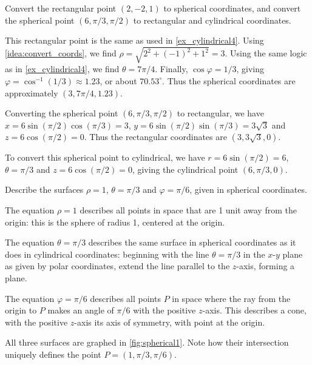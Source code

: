 
{Convert the rectangular point $(2,-2,1)$ to spherical coordinates, and convert the spherical point $(6,\pi/3,\pi/2)$ to rectangular and cylindrical coordinates.}
{This rectangular point is the same as used in \autoref{ex_cylindrical4}. Using \autoref{idea:convert_coords}, we find $\rho = \sqrt{2^2+(-1)^2+1^2} = 3$. Using the same logic as in \autoref{ex_cylindrical4}, we find $\theta = 7\pi/4$. Finally, $\cos\varphi = 1/3$, giving $\varphi = \cos^{-1}(1/3) \approx 1.23$, or about $70.53^\circ$. Thus the spherical coordinates are approximately $(3,7\pi/4,1.23)$.

Converting the spherical point $(6,\pi/3,\pi/2)$ to rectangular, we have $x = 6\sin(\pi/2)\cos(\pi/3) = 3$, $y = 6\sin(\pi/2)\sin(\pi/3) = 3\sqrt{3}$ and $z = 6\cos(\pi/2) = 0$. Thus the rectangular coordinates are $(3,3\sqrt{3},0)$.

To convert this spherical point to cylindrical, we have $r = 6\sin(\pi/2) = 6$, $\theta = \pi/3$ and $z = 6\cos(\pi/2) =0$, giving the cylindrical point $(6,\pi/3,0)$.}


{Describe the surfaces $\rho=1$, $\theta = \pi/3$ and $\varphi = \pi/6$, given in spherical coordinates.}
{The equation $\rho = 1$ describes all points in space that are 1 unit away from the origin: this is the sphere of radius 1, centered at the origin.

The equation $\theta = \pi/3$ describes the same surface in spherical coordinates as it does in cylindrical coordinates: beginning with the line $\theta = \pi/3$ in the $x$-$y$ plane as given by polar coordinates, extend the line parallel to the $z$-axis, forming a plane.

The equation $\varphi=\pi/6$ describes all points $P$ in space where the ray from the origin to $P$ makes an angle of $\pi/6$ with the positive $z$-axis. This describes a cone, with the positive $z$-axis its axis of symmetry, with point at the origin.

All three surfaces are graphed in \autoref{fig:spherical1}. Note how their intersection uniquely defines the point $P=(1,\pi/3,\pi/6)$.}

